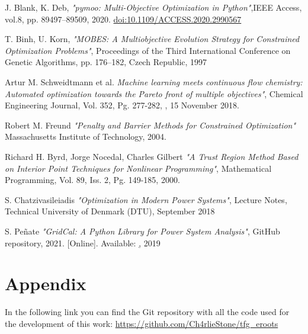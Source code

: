 \documentclass[a4paper,11pt, titlepage, twoside]{article}
\begin{document}
\begin{thebibliography}{99}
{J. Blank, K. Deb},
\textit{"pymoo: Multi-Objective Optimization in Python"},IEEE Access, vol.8, pp. 89497–89509, 2020. \href{https://ieeexplore.ieee.org/document/9078759}{doi:10.1109/ACCESS.2020.2990567}

{T. Binh, U. Korn},
\textit{"MOBES: A Multiobjective Evolution Strategy for Constrained Optimization Problems"}, Proceedings of the Third International Conference on Genetic Algorithms, 
pp. 176–182, Czech Republic, 1997

{Artur M. Schweidtmann et al.}
\textit{Machine learning meets continuous flow chemistry: Automated
optimization towards the Pareto front of multiple objectives"}, Chemical Engineering Journal, Vol. 352, Pg. 277-282, , 15 November 2018.

{Robert M. Freund}
\textit{"Penalty and Barrier Methods for Constrained Optimization"} Massachusetts Institute of Technology, 2004.

{Richard H. Byrd, Jorge Nocedal, Charles Gilbert}
\textit{"A Trust Region Method Based on Interior Point Techniques for Nonlinear Programming"}, Mathematical Programming, Vol. 89, Iss. 2, Pg. 149-185, 2000.
 

{S. Chatzivasileiadis}
\textit{"Optimization in Modern Power Systems"}, Lecture Notes, Technical University of Denmark (DTU), September 2018

{S. Peñate}
\textit{"GridCal: A Python Library for Power System Analysis"}, GitHub repository, 2021. [Online]. Available: \href{https://github.com/SanPen/GridCal}, 2019
\end{thebibliography}


\section*{Appendix}\label{Appendix}

In the following link you can find the Git repository with all the code used for the development of this work:
\url{https://github.com/Ch4rlieStone/tfg_eroots}
 
\end{document}

